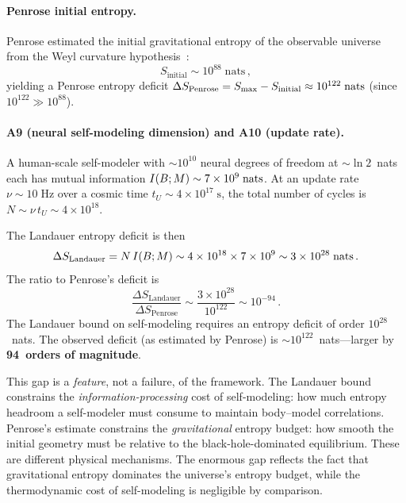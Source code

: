 \paragraph{Penrose initial entropy.}
Penrose estimated the initial gravitational entropy of the observable
universe from the Weyl curvature hypothesis~\cite{Penrose1979}:
\begin{equation}
  S_{\mathrm{initial}} \sim 10^{88}\;\text{nats}\,,
  \label{eq:penrose-s}
\end{equation}
yielding a Penrose entropy deficit
$\Delta S_{\mathrm{Penrose}} = S_{\max} - S_{\mathrm{initial}}
\approx 10^{122}\;\text{nats}$ (since $10^{122} \gg 10^{88}$).

\paragraph{A9 (neural self-modeling dimension) and A10 (update rate).}
A human-scale self-modeler with $\sim 10^{10}$ neural degrees of
freedom at $\sim\!\ln 2$~nats each has mutual information
$I(B;M) \sim 7\times 10^{9}\;\text{nats}$.  At an update rate
$\nu \sim 10\;\text{Hz}$ over a cosmic time
$t_U \sim 4\times 10^{17}\;\text{s}$, the total number of cycles is
$N \sim \nu\, t_U \sim 4\times 10^{18}$.

\medskip
The Landauer entropy deficit is then
\begin{equation}
  \Delta S_{\mathrm{Landauer}}
  = N\,I(B;M)
  \sim 4\times 10^{18}\times 7\times 10^{9}
  \sim 3\times 10^{28}\;\text{nats}\,.
  \label{eq:delta-s-landauer}
\end{equation}
The ratio to Penrose's deficit is
\begin{equation}
  \frac{\Delta S_{\mathrm{Landauer}}}{\Delta S_{\mathrm{Penrose}}}
  \sim \frac{3\times 10^{28}}{10^{122}} \sim 10^{-94}\,.
  \label{eq:gap-94}
\end{equation}
The Landauer bound on self-modeling requires an entropy deficit of
order $10^{28}$~nats.  The observed deficit (as estimated by
Penrose) is $\sim\!10^{122}$~nats---larger by
\textbf{94~orders of magnitude}.

This gap is a \emph{feature}, not a failure, of the framework.  The
Landauer bound constrains the \emph{information-processing} cost of
self-modeling: how much entropy headroom a self-modeler must consume
to maintain body--model correlations.  Penrose's estimate constrains
the \emph{gravitational} entropy budget: how smooth the initial
geometry must be relative to the black-hole-dominated equilibrium.
These are different physical mechanisms.  The enormous gap reflects
the fact that gravitational entropy dominates the universe's entropy
budget, while the thermodynamic cost of self-modeling is negligible by
comparison.

